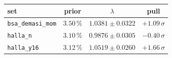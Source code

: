 \begin{tabular}{lccc}
\toprule
set & prior & $\lambda$ & pull \\
\midrule
\texttt{bsa\_demasi\_mom} & $3.50\,\%$ & $1.0381 \pm 0.0322$ & $+1.09\,\sigma$ \\
\texttt{halla\_n} & $3.10\,\%$ & $0.9876 \pm 0.0305$ & $-0.40\,\sigma$ \\
\texttt{halla\_y16} & $3.12\,\%$ & $1.0519 \pm 0.0260$ & $+1.66\,\sigma$ \\
\bottomrule
\end{tabular}
